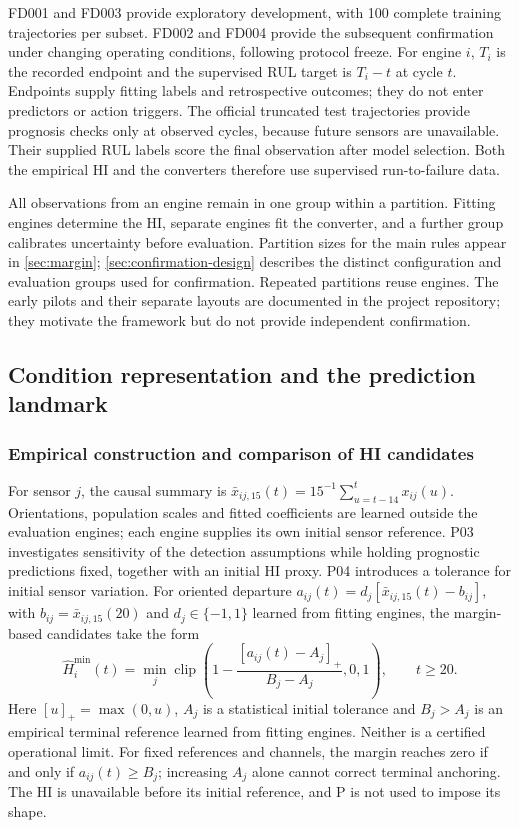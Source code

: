 \documentclass[preprint,12pt]{elsarticle}
\begin{document}
FD001 and FD003 provide exploratory development, with 100 complete training trajectories per subset. FD002 and FD004 provide the subsequent confirmation under changing operating conditions, following protocol freeze. For engine $i$, $T_i$ is the recorded endpoint and the supervised RUL target is $T_i-t$ at cycle $t$. Endpoints supply fitting labels and retrospective outcomes; they do not enter predictors or action triggers. The official truncated test trajectories provide prognosis checks only at observed cycles, because future sensors are unavailable. Their supplied RUL labels score the final observation after model selection. Both the empirical HI and the converters therefore use supervised run-to-failure data.

All observations from an engine remain in one group within a partition. Fitting engines determine the HI, separate engines fit the converter, and a further group calibrates uncertainty before evaluation. Partition sizes for the main rules appear in \cref{sec:margin}; \cref{sec:confirmation-design} describes the distinct configuration and evaluation groups used for confirmation. Repeated partitions reuse engines. The early pilots and their separate layouts are documented in the project repository; they motivate the framework but do not provide independent confirmation.

\subsection{Condition representation and the prediction landmark}


\subsubsection{Empirical construction and comparison of HI candidates}

For sensor $j$, the causal summary is $\bar x_{ij,15}(t)=15^{-1}\sum_{u=t-14}^{t}x_{ij}(u)$. Orientations, population scales and fitted coefficients are learned outside the evaluation engines; each engine supplies its own initial sensor reference. P03 investigates sensitivity of the detection assumptions while holding prognostic predictions fixed, together with an initial HI proxy. P04 introduces a tolerance for initial sensor variation. For oriented departure $a_{ij}(t)=d_j[\bar x_{ij,15}(t)-b_{ij}]$, with $b_{ij}=\bar x_{ij,15}(20)$ and $d_j\in\{-1,1\}$ learned from fitting engines, the margin-based candidates take the form
\[
\widehat H_i^{\min}(t)=\min_j\operatorname{clip}
\left(1-\frac{[a_{ij}(t)-A_j]_+}{B_j-A_j},0,1\right),
\qquad t\geq20.
\]
Here $[u]_+=\max(0,u)$, $A_j$ is a statistical initial tolerance and $B_j>A_j$ is an empirical terminal reference learned from fitting engines. Neither is a certified operational limit. For fixed references and channels, the margin reaches zero if and only if $a_{ij}(t)\geq B_j$; increasing $A_j$ alone cannot correct terminal anchoring. The HI is unavailable before its initial reference, and P is not used to impose its shape.
\end{document}
